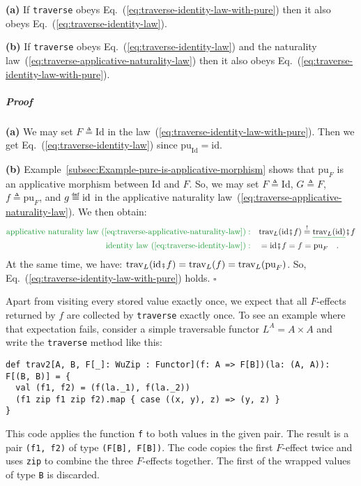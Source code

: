 \textbf{(a)} If \lstinline!traverse! obeys Eq.~(\ref{eq:traverse-identity-law-with-pure})
then it also obeys Eq.~(\ref{eq:traverse-identity-law}).

\textbf{(b)} If \lstinline!traverse! obeys Eq.~(\ref{eq:traverse-identity-law})
and the naturality law~(\ref{eq:traverse-applicative-naturality-law})
then it also obeys Eq.~(\ref{eq:traverse-identity-law-with-pure}).

\subparagraph{Proof}

\textbf{(a)} We may set $F\triangleq\text{Id}$ in the law~(\ref{eq:traverse-identity-law-with-pure}).
Then we get Eq.~(\ref{eq:traverse-identity-law}) since $\text{pu}_{\text{Id}}=\text{id}$.

\textbf{(b)} Example~\ref{subsec:Example-pure-is-applicative-morphism}
shows that $\text{pu}_{F}$ is an applicative morphism between $\text{Id}$
and $F$. So, we may set $F\triangleq\text{Id}$, $G\triangleq F$,
$f\triangleq\text{pu}_{F}$, and $g\triangleq\text{\text{id}}$ in
the applicative naturality law~(\ref{eq:traverse-applicative-naturality-law}).
We then obtain:
\begin{align*}
{\color{greenunder}\text{applicative naturality law~(\ref{eq:traverse-applicative-naturality-law})}:}\quad & \text{trav}_{L}(\text{id}\bef f)\overset{!}{=}\gunderline{\text{trav}_{L}(\text{id})}\bef f\\
{\color{greenunder}\text{identity law~(\ref{eq:traverse-identity-law})}:}\quad & =\text{id}\bef f=f=\text{pu}_{F}\quad.
\end{align*}
At the same time, we have: $\text{trav}_{L}(\text{id}\bef f)=\text{trav}_{L}(f)=\text{trav}_{L}(\text{pu}_{F})$.
So, Eq.~(\ref{eq:traverse-identity-law-with-pure}) holds. $\square$

Apart from visiting every stored value exactly once, we expect that
all $F$-effects returned by $f$ are collected by \lstinline!traverse!
exactly once. To see an example where that expectation fails, consider
a simple traversable functor $L^{A}=A\times A$ and write the \lstinline!traverse!
method like this:
\begin{lstlisting}
def trav2[A, B, F[_]: WuZip : Functor](f: A => F[B])(la: (A, A)): F[(B, B)] = {
  val (f1, f2) = (f(la._1), f(la._2))
  (f1 zip f1 zip f2).map { case ((x, y), z) => (y, z) }
}
\end{lstlisting}
This code applies the function \lstinline!f! to both values in the
given pair. The result is a pair \lstinline!(f1, f2)! of type \lstinline!(F[B], F[B])!.
The code copies the first $F$-effect twice and uses \lstinline!zip!
to combine the three $F$-effects together. The first of the wrapped
values of type \lstinline!B! is discarded.

